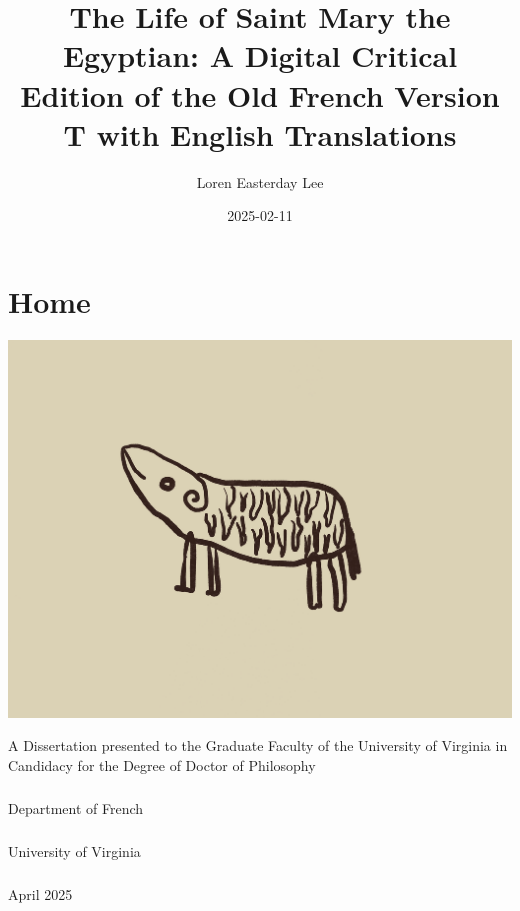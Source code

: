 \documentclass[
  letterpaper,
  DIV=11,
  numbers=noendperiod,
  oneside]{scrreprt}
\title{The Life of Saint Mary the Egyptian: A Digital Critical Edition
of the Old French Version T with English Translations}
\author{Loren Easterday Lee}
\date{2025-02-11}
\makeatletter
\let\oldparagraph\paragraph
\renewcommand{\paragraph}{
    \@ifstar
      \xxxParagraphStar
      \xxxParagraphNoStar
  }
\newcommand{\xxxParagraphStar}[1]{\oldparagraph*{#1}\mbox{}}
\newcommand{\xxxParagraphNoStar}[1]{\oldparagraph{#1}\mbox{}}
\renewcommand*\contentsname{Table of contents}
\newcommand\contentsname{Table of contents}
\makeatother
\begin{document}
\maketitle

\renewcommand*\contentsname{Table of contents}
{
\hypersetup{linkcolor=}
\setcounter{tocdepth}{2}
\tableofcontents
}


\chapter{Home}\label{home}

\begin{center}
\includegraphics[width=1\textwidth,height=\textheight]{images/shesasheep.jpeg}
\end{center}

A Dissertation presented to the Graduate Faculty of the University of
Virginia in Candidacy for the Degree of Doctor of Philosophy

\paragraph{Department of French}\label{department-of-french}

\paragraph{University of Virginia}\label{university-of-virginia}

\paragraph{April 2025}\label{april-2025}
\end{document}
